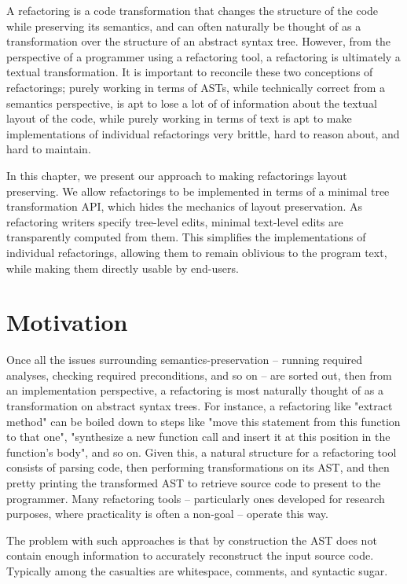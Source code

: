 A refactoring is a code transformation that changes the structure of the code
while preserving its semantics, and can often naturally be thought of as a
transformation over the structure of an abstract syntax tree. However, from
the perspective of a programmer using a refactoring tool, a refactoring is
ultimately a textual transformation. It is important to reconcile these two
conceptions of refactorings; purely working in terms of ASTs, while
technically correct from a semantics perspective, is apt to lose a lot of
of information about the textual layout of the code, while purely working
in terms of text is apt to make implementations of individual refactorings
very brittle, hard to reason about, and hard to maintain.

In this chapter, we present our approach to making refactorings layout
preserving.  We allow refactorings to be implemented in terms of a minimal tree
transformation API, which hides the mechanics of layout preservation. As
refactoring writers specify tree-level edits, minimal text-level edits are
transparently computed from them. This simplifies the implementations of
individual refactorings, allowing them to remain oblivious to the program text,
while making them directly usable by end-users.

\section{Motivation}

Once all the issues surrounding semantics-preservation -- running required
analyses, checking required preconditions, and so on -- are sorted out,
then from an implementation perspective, a refactoring is most
naturally thought of as a transformation on abstract syntax trees. For
instance, a refactoring like "extract method" can be boiled down to steps like
"move this statement from this function to that one", "synthesize a new
function call and insert it at this position in the function's body", and so
on. Given this, a natural structure for a refactoring tool consists of parsing
code, then performing transformations on its AST, and then pretty printing the
transformed AST to retrieve source code to present to the programmer. Many
refactoring tools -- particularly ones developed for research purposes, where
practicality is often a non-goal -- operate this way.

The problem with such approaches is that by construction the AST does not
contain enough information to accurately reconstruct the input source code.
Typically among the casualties are whitespace, comments, and syntactic sugar.

